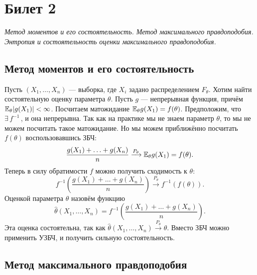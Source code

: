 \section{Билет 2}

\begin{center}
    \it
    Метод моментов и его состоятельность.
    Метод максимального правдоподобия.
    Энтропия и состоятельность оценки максимального правдоподобия.
\end{center}

\usetikzlibrary{arrows}

\subsection{Метод моментов и его состоятельность}
Пусть $(X_1, \ldots, X_n)$ --- выборка, где $X_i$ задано распределением $F_{\theta}$. Хотим найти состоятельную оценку параметра $\theta$.
Пусть $g$ --- непрерывная функция, причём $\mathbb{E}_{\theta} |g(X_1)| < \infty$. Посчитаем матожидание $\mathbb{E}_{\theta} g(X_1) = f(\theta)$.
Предположим, что $\exists\, f^{-1}\,$, и она непрерывна.
Так как на практике мы не знаем параметр $\theta$, то мы не можем посчитать такое матожидание.
Но мы можем приближённо посчитать $f(\theta)$ воспользовавшись ЗБЧ:
\[
    \frac{g(X_1) + \ldots + g(X_n)}{n} \xrightarrow{P_\theta} \mathbb{E}_{\theta} g(X_1) = f(\theta).
\]
Теперь в силу обратимости $f$ можно получить сходимость к $\theta$:
\[
    f^{-1}\left( \frac{g(X_1) + \ldots + g(X_n)}{n} \right) \xrightarrow{P_\theta} f^{-1}(f(\theta)).
\]
Оценкой параметра $\theta$ назовём функцию
\begin{equation*}
    \hat{\theta}(X_1, \ldots, X_n) = f^{-1}\left( \frac{g(X_1) + \ldots + g(X_n)}{n} \right)
.\end{equation*}
Эта оценка состоятельна, так как $\hat{\theta}(X_1, \dots, X_n) \xrightarrow{P_\theta} \theta$.
Вместо ЗБЧ можно применить УЗБЧ, и получить сильную состоятельность.

\subsection{Метод максимального правдоподобия}

